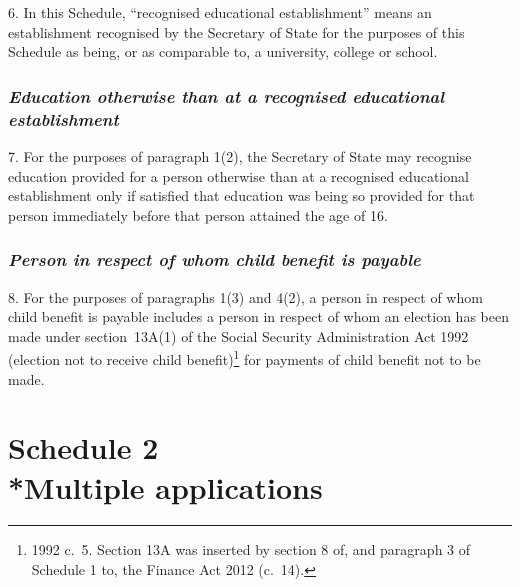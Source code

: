 \documentclass[a4paper,12pt]{article}
\begin{document}
6.  In this Schedule, “recognised educational establishment” means an establishment recognised by the Secretary of State for the purposes of this Schedule as being, or as comparable to, a university, college or school.


\section*{\itshape Education otherwise than at a recognised educational establishment}

7.  For the purposes of paragraph 1(2), the Secretary of State may recognise education provided for a person otherwise than at a recognised educational establishment only if satisfied that education was being so provided for that person immediately before that person attained the age of 16.


\section*{\itshape Person in respect of whom child benefit is payable}

8.  For the purposes of paragraphs 1(3) and 4(2), a person in respect of whom child benefit is payable includes a person in respect of whom an election has been made under section~13A(1) of the Social Security Administration Act 1992 (election not to receive child benefit)\footnote{1992 c.~5. Section 13A was inserted by section 8 of, and paragraph 3 of Schedule 1 to, the Finance Act 2012 (c.~14).} for payments of child benefit not to be made.


\part[Schedule 2 --- Multiple applications]{Schedule 2\\*Multiple applications}
\end{document}
